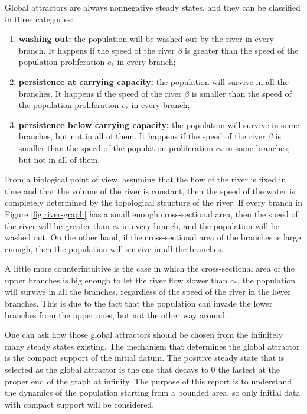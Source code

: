 Global attractors are always nonnegative steady states, and they can be classified in three categories:
\begin{enumerate}[label=(\roman*)]
    \item \textbf{washing out:} the population will be washed out by the river in every branch. It happens if the speed of the river \(\beta\) is greater than the speed of the population proliferation \(c_*\) in every branch;
    \item \textbf{persistence at carrying capacity:} the population will survive in all the branches. It happens if the speed of the river \(\beta\) is smaller than the speed of the population proliferation \(c_*\) in every branch;
    \item \textbf{persistence below carrying capacity:} the population will survive in some branches, but not in all of them. It happens if the speed of the river \(\beta\) is smaller than the speed of the population proliferation \(c_*\) in some branches, but not in all of them.
\end{enumerate}

From a biological point of view, assuming that the flow of the river is fixed in time and that the volume of the river is constant, then the speed of the water is completely determined by the topological structure of the river. If every branch in Figure \ref{fig:river-graph} has a small enough cross-sectional area, then the speed of the river will be greater than \(c_*\) in every branch, and the population will be washed out. On the other hand, if the cross-sectional area of the branches is large enough, then the population will survive in all the branches.

A little more counterintuitive is the case in which the cross-sectional area of the upper branches is big enough to let the river flow slower than \(c_*\), the population will survive in all the branches, regardless of the speed of the river in the lower branches. This is due to the fact that the population can invade the lower branches from the upper ones, but not the other way around.

One can ask how those global attractors should be chosen from the infinitely many steady states existing. The mechanism that determines the global attractor is the compact support of the initial datum. The positive steady state that is selected as the global attractor is the one that decays to \(0\) the fastest at the proper end of the graph at infinity. The purpose of this report is to understand the dynamics of the population starting from a bounded area, so only initial data with compact support will be considered.

